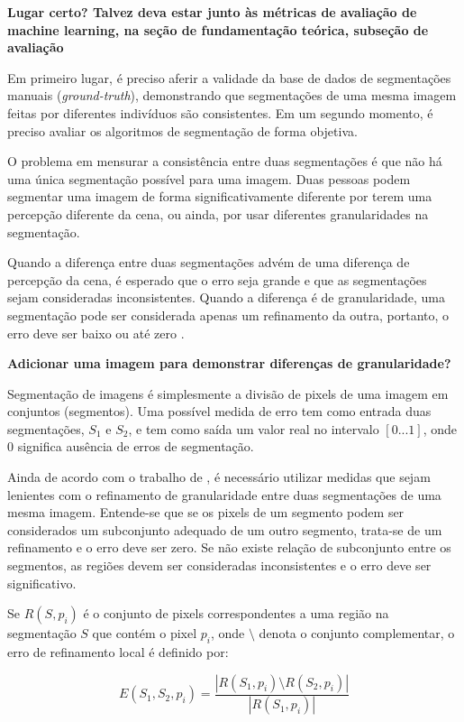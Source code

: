 \textbf{Lugar certo? Talvez deva estar junto às métricas de avaliação de machine learning, na seção de fundamentação teórica, subseção de avaliação}

Em primeiro lugar, é preciso aferir a validade da base de dados de segmentações manuais (\textit{ground-truth}), demonstrando que segmentações de uma mesma imagem feitas por diferentes indivíduos são consistentes. Em um segundo momento, é preciso avaliar os algoritmos de segmentação de forma objetiva.

O problema em mensurar a consistência entre duas segmentações é que não há uma única segmentação possível para uma imagem. Duas pessoas podem segmentar uma imagem de forma significativamente diferente por terem uma percepção diferente da cena, ou ainda, por usar diferentes granularidades na segmentação.

Quando a diferença entre duas segmentações advém de uma diferença de percepção da cena, é esperado que o erro seja grande e que as segmentações sejam consideradas inconsistentes. Quando a diferença é de granularidade, uma segmentação pode ser considerada apenas um refinamento da outra, portanto, o erro deve ser baixo ou até zero \cite{martin:2001}.

\textbf{Adicionar uma imagem para demonstrar diferenças de granularidade?}

Segmentação de imagens é simplesmente a divisão de pixels de uma imagem em conjuntos (segmentos). Uma possível medida de erro tem como entrada duas segmentações, $S_1$ e $S_2$, e tem como saída um valor real no intervalo $[0...1]$, onde $0$ significa ausência de erros de segmentação.

Ainda de acordo com o trabalho de , é necessário utilizar medidas que sejam lenientes com o refinamento de granularidade entre duas segmentações de uma mesma imagem. Entende-se que se os pixels de um segmento podem ser considerados um subconjunto adequado de um outro segmento, trata-se de um refinamento e o erro deve ser zero. Se não existe relação de subconjunto entre os segmentos, as regiões devem ser consideradas inconsistentes e o erro deve ser significativo.

Se $R(S,p_i)$ é o conjunto de pixels correspondentes a uma região na segmentação $S$ que contém o pixel $p_i$, onde $\setminus$ denota o conjunto complementar, o erro de refinamento local é definido por:

\begin{equation}
	E(S_1,S_2,p_i) = \frac{|R(S_1,p_i) \setminus R(S_2,p_i)|}{|R(S_1,p_i)|}
\end{equation}



